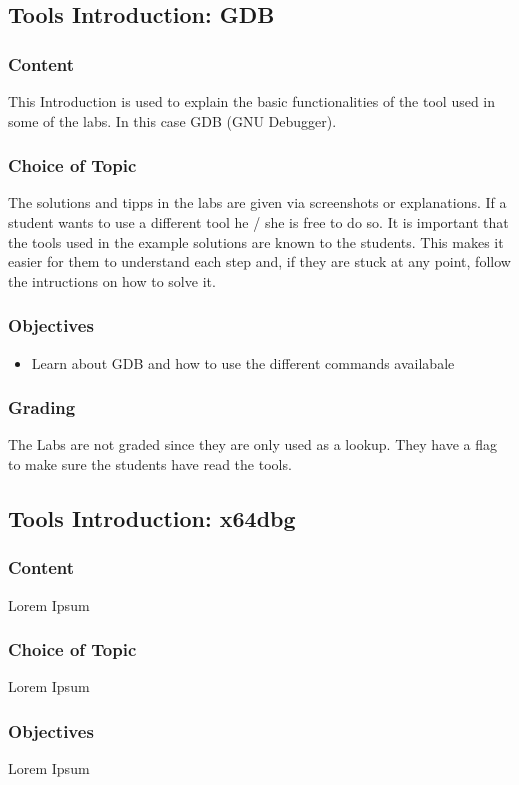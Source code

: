 \subsection{Tools Introduction: GDB}
\subsubsection*{Content}
This Introduction is used to explain the basic functionalities of the tool used in some of the labs. In this case GDB (GNU Debugger).
\subsubsection*{Choice of Topic}
The solutions and tipps in the labs are given via screenshots or explanations. If a student wants to use a different tool he / she is free to do so. It is important that the tools used in the example solutions are known to the students. This makes it easier for them to understand each step and, if they are stuck at any point, follow the intructions on how to solve it. 
\subsubsection*{Objectives}
\begin{itemize}
    \item Learn about GDB and how to use the different commands availabale
\end{itemize}
\subsubsection*{Grading}
The Labs are not graded since they are only used as a lookup. They have a flag to make sure the students have read the tools.

\subsection{Tools Introduction: x64dbg}
\subsubsection*{Content}
Lorem Ipsum
\subsubsection*{Choice of Topic}
Lorem Ipsum
\subsubsection*{Objectives}
Lorem Ipsum
